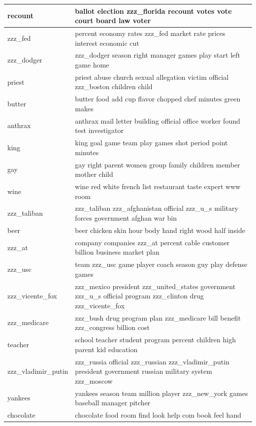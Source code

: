 \documentclass{article}
\begin{document}
\begin{tabular}{ l | l }
    recount & ballot election zzz\_florida recount votes vote court board law voter \\ \hline 
    zzz\_fed & percent economy rates zzz\_fed market rate prices interest economic cut \\ \hline 
    zzz\_dodger & zzz\_dodger season right manager games play start left game home \\ \hline 
    priest & priest abuse church sexual allegation victim official zzz\_boston children child \\ \hline 
    butter & butter food add cup flavor chopped chef minutes green makes \\ \hline 
    anthrax & anthrax mail letter building official office worker found test investigator \\ \hline 
    king & king goal game team play games shot period point minutes \\ \hline 
    gay & gay right parent women group family children member mother child \\ \hline 
    wine & wine red white french list restaurant taste expert www room \\ \hline 
    zzz\_taliban & zzz\_taliban zzz\_afghanistan official zzz\_u\_s military forces government afghan war bin \\ \hline 
    beer & beer chicken skin hour body hand right wood half inside \\ \hline 
    zzz\_at & company companies zzz\_at percent cable customer billion business market plan \\ \hline 
    zzz\_usc & team zzz\_usc game player coach season guy play defense games \\ \hline 
    zzz\_vicente\_fox & zzz\_mexico president zzz\_united\_states government zzz\_u\_s official program zzz\_clinton drug zzz\_vicente\_fox \\ \hline 
    zzz\_medicare & zzz\_bush drug program plan zzz\_medicare bill benefit zzz\_congress billion cost \\ \hline 
    teacher & school teacher student program percent children high parent kid education \\ \hline 
    zzz\_vladimir\_putin & zzz\_russia official zzz\_russian zzz\_vladimir\_putin president government russian military system zzz\_moscow \\ \hline 
    yankees & yankees season team million player zzz\_new\_york games baseball manager pitcher \\ \hline 
    chocolate & chocolate food room find look help com book feel hand \\ \hline 

\end{tabular}
\end{document}
